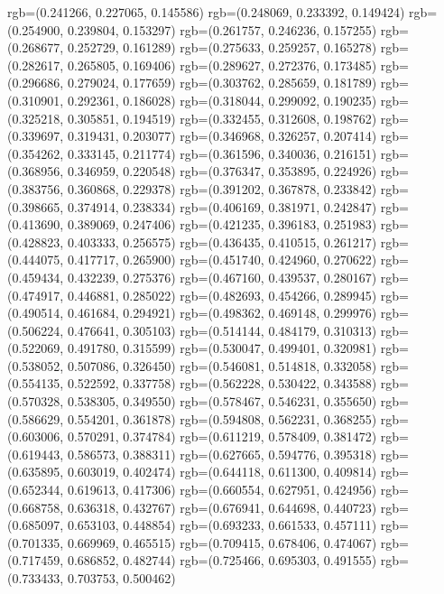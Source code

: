 {{{					rgb=(0.241266, 0.227065, 0.145586)
					rgb=(0.248069, 0.233392, 0.149424)
					rgb=(0.254900, 0.239804, 0.153297)
					rgb=(0.261757, 0.246236, 0.157255)
					rgb=(0.268677, 0.252729, 0.161289)
					rgb=(0.275633, 0.259257, 0.165278)
					rgb=(0.282617, 0.265805, 0.169406)
					rgb=(0.289627, 0.272376, 0.173485)
					rgb=(0.296686, 0.279024, 0.177659)
					rgb=(0.303762, 0.285659, 0.181789)
					rgb=(0.310901, 0.292361, 0.186028)
					rgb=(0.318044, 0.299092, 0.190235)
					rgb=(0.325218, 0.305851, 0.194519)
					rgb=(0.332455, 0.312608, 0.198762)
					rgb=(0.339697, 0.319431, 0.203077)
					rgb=(0.346968, 0.326257, 0.207414)
					rgb=(0.354262, 0.333145, 0.211774)
					rgb=(0.361596, 0.340036, 0.216151)
					rgb=(0.368956, 0.346959, 0.220548)
					rgb=(0.376347, 0.353895, 0.224926)
					rgb=(0.383756, 0.360868, 0.229378)
					rgb=(0.391202, 0.367878, 0.233842)
					rgb=(0.398665, 0.374914, 0.238334)
					rgb=(0.406169, 0.381971, 0.242847)
					rgb=(0.413690, 0.389069, 0.247406)
					rgb=(0.421235, 0.396183, 0.251983)
					rgb=(0.428823, 0.403333, 0.256575)
					rgb=(0.436435, 0.410515, 0.261217)
					rgb=(0.444075, 0.417717, 0.265900)
					rgb=(0.451740, 0.424960, 0.270622)
					rgb=(0.459434, 0.432239, 0.275376)
					rgb=(0.467160, 0.439537, 0.280167)
					rgb=(0.474917, 0.446881, 0.285022)
					rgb=(0.482693, 0.454266, 0.289945)
					rgb=(0.490514, 0.461684, 0.294921)
					rgb=(0.498362, 0.469148, 0.299976)
					rgb=(0.506224, 0.476641, 0.305103)
					rgb=(0.514144, 0.484179, 0.310313)
					rgb=(0.522069, 0.491780, 0.315599)
					rgb=(0.530047, 0.499401, 0.320981)
					rgb=(0.538052, 0.507086, 0.326450)
					rgb=(0.546081, 0.514818, 0.332058)
					rgb=(0.554135, 0.522592, 0.337758)
					rgb=(0.562228, 0.530422, 0.343588)
					rgb=(0.570328, 0.538305, 0.349550)
					rgb=(0.578467, 0.546231, 0.355650)
					rgb=(0.586629, 0.554201, 0.361878)
					rgb=(0.594808, 0.562231, 0.368255)
					rgb=(0.603006, 0.570291, 0.374784)
					rgb=(0.611219, 0.578409, 0.381472)
					rgb=(0.619443, 0.586573, 0.388311)
					rgb=(0.627665, 0.594776, 0.395318)
					rgb=(0.635895, 0.603019, 0.402474)
					rgb=(0.644118, 0.611300, 0.409814)
					rgb=(0.652344, 0.619613, 0.417306)
					rgb=(0.660554, 0.627951, 0.424956)
					rgb=(0.668758, 0.636318, 0.432767)
					rgb=(0.676941, 0.644698, 0.440723)
					rgb=(0.685097, 0.653103, 0.448854)
					rgb=(0.693233, 0.661533, 0.457111)
					rgb=(0.701335, 0.669969, 0.465515)
					rgb=(0.709415, 0.678406, 0.474067)
					rgb=(0.717459, 0.686852, 0.482744)
					rgb=(0.725466, 0.695303, 0.491555)
					rgb=(0.733433, 0.703753, 0.500462)
}}}
